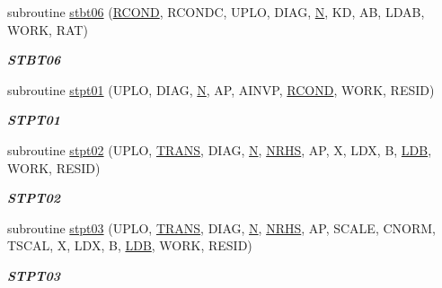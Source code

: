 \begin{DoxyCompactItemize}
subroutine \hyperlink{group__single__lin_gadc003f80b4df1d509d1a3ca75cac5c73}{stbt06} (\hyperlink{superlu__enum__consts_8h_af00a42ecad444bbda75cde1b64bd7e72a9b5c151728d8512307565994c89919d5}{R\+C\+O\+N\+D}, R\+C\+O\+N\+D\+C, U\+P\+L\+O, D\+I\+A\+G, \hyperlink{polmisc_8c_a0240ac851181b84ac374872dc5434ee4}{N}, K\+D, A\+B, L\+D\+A\+B, W\+O\+R\+K, R\+A\+T)
\begin{DoxyCompactList}\small\item\em {\bfseries S\+T\+B\+T06} \end{DoxyCompactList}\item 
subroutine \hyperlink{group__single__lin_gae98d46926a49fb336a768786f4ea5784}{stpt01} (U\+P\+L\+O, D\+I\+A\+G, \hyperlink{polmisc_8c_a0240ac851181b84ac374872dc5434ee4}{N}, A\+P, A\+I\+N\+V\+P, \hyperlink{superlu__enum__consts_8h_af00a42ecad444bbda75cde1b64bd7e72a9b5c151728d8512307565994c89919d5}{R\+C\+O\+N\+D}, W\+O\+R\+K, R\+E\+S\+I\+D)
\begin{DoxyCompactList}\small\item\em {\bfseries S\+T\+P\+T01} \end{DoxyCompactList}\item 
subroutine \hyperlink{group__single__lin_ga63bca6a0631a6ea02c368c51f90f9d4f}{stpt02} (U\+P\+L\+O, \hyperlink{superlu__enum__consts_8h_a0c4e17b2d5cea33f9991ccc6a6678d62a1f61e3015bfe0f0c2c3fda4c5a0cdf58}{T\+R\+A\+N\+S}, D\+I\+A\+G, \hyperlink{polmisc_8c_a0240ac851181b84ac374872dc5434ee4}{N}, \hyperlink{example__user_8c_aa0138da002ce2a90360df2f521eb3198}{N\+R\+H\+S}, A\+P, X, L\+D\+X, B, \hyperlink{example__user_8c_a50e90a7104df172b5a89a06c47fcca04}{L\+D\+B}, W\+O\+R\+K, R\+E\+S\+I\+D)
\begin{DoxyCompactList}\small\item\em {\bfseries S\+T\+P\+T02} \end{DoxyCompactList}\item 
subroutine \hyperlink{group__single__lin_gacc2fc11e74662322b31ba6e7b8615b2d}{stpt03} (U\+P\+L\+O, \hyperlink{superlu__enum__consts_8h_a0c4e17b2d5cea33f9991ccc6a6678d62a1f61e3015bfe0f0c2c3fda4c5a0cdf58}{T\+R\+A\+N\+S}, D\+I\+A\+G, \hyperlink{polmisc_8c_a0240ac851181b84ac374872dc5434ee4}{N}, \hyperlink{example__user_8c_aa0138da002ce2a90360df2f521eb3198}{N\+R\+H\+S}, A\+P, S\+C\+A\+L\+E, C\+N\+O\+R\+M, T\+S\+C\+A\+L, X, L\+D\+X, B, \hyperlink{example__user_8c_a50e90a7104df172b5a89a06c47fcca04}{L\+D\+B}, W\+O\+R\+K, R\+E\+S\+I\+D)
\begin{DoxyCompactList}\small\item\em {\bfseries S\+T\+P\+T03} \end{DoxyCompactList}\item 

\end{DoxyCompactItemize}
